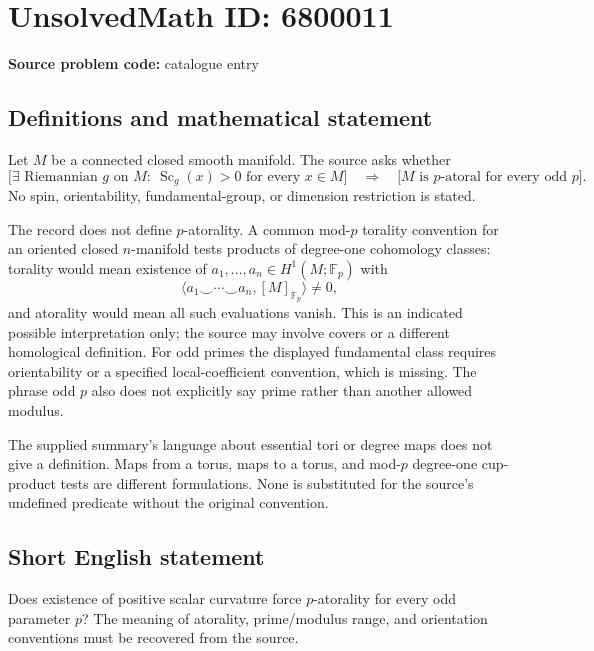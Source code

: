 \documentclass[11pt]{article}
\newcommand{\F}{\mathbb{F}}
\begin{document}
\section*{UnsolvedMath ID: 6800011}
\textbf{Source problem code:} catalogue entry
\subsection{Definitions and mathematical statement}
Let $M$ be a connected closed smooth manifold. The source asks whether
\[
\bigl[\exists\text{ Riemannian }g\text{ on }M:\ \operatorname{Sc}_g(x)>0
\text{ for every }x\in M\bigr]
\quad\Longrightarrow\quad
\bigl[M\text{ is }p\text{-atoral for every odd }p\bigr].
\]
No spin, orientability, fundamental-group, or dimension restriction is stated.

The record does not define $p$-atorality. A common mod-$p$ torality convention for an oriented closed $n$-manifold tests products of degree-one cohomology classes: torality would mean existence of $a_1,\ldots,a_n\in H^1(M;\F_p)$ with
\[
\langle a_1\smile\cdots\smile a_n,[M]_{\F_p}\rangle\ne0,
\]
and atorality would mean all such evaluations vanish. This is an indicated possible interpretation only; the source may involve covers or a different homological definition. For odd primes the displayed fundamental class requires orientability or a specified local-coefficient convention, which is missing. The phrase odd $p$ also does not explicitly say prime rather than another allowed modulus.

The supplied summary's language about essential tori or degree maps does not give a definition. Maps from a torus, maps to a torus, and mod-$p$ degree-one cup-product tests are different formulations. None is substituted for the source's undefined predicate without the original convention.
\subsection{Short English statement}
Does existence of positive scalar curvature force $p$-atorality for every odd parameter $p$? The meaning of atorality, prime/modulus range, and orientation conventions must be recovered from the source.
\end{document}
